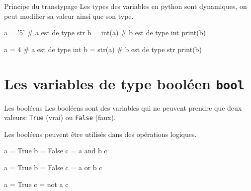 \begin{easybox}{Principe du transtypage}{}
    Les types des variables en python sont dynamiques, on peut modifier sa valeur ainsi que son type.
    
    \begin{minipage}[t]{0.48\linewidth}
        \begin{ConsolePythontex}[TaillePolice=\large, Label=false]{}
            a = '5'     # a est de type str
            b = int(a)  # b est de type int
            print(b)
        \end{ConsolePythontex}
    \end{minipage}\hfill
    \begin{minipage}[t]{0.48\linewidth}
        \begin{ConsolePythontex}[TaillePolice=\large, Label=false]{}
            a = 4       # a est de type int
            b = str(a)  # b est de type str
            print(b)
        \end{ConsolePythontex}
    \end{minipage}
    
    \end{easybox}

    \section{Les variables de type booléen \texttt{bool}}

    
\begin{easybox}{Les booléens}{}
    \smallskip
    Les booléens sont des variables qui ne peuvent prendre que deux valeurs: \verb+True+ (vrai) ou \verb+False+ (faux).
    
    \smallskip
    Les booléens peuvent être utilisés dans des opérations logiques.
    
	\medskip

    \begin{minipage}{0.32\linewidth}
        \begin{ConsolePythontex}[TaillePolice=\large, Label=false]{}
a = True
b = False
c = a and b
c
        \end{ConsolePythontex}
    \end{minipage}\hfill
    \begin{minipage}{0.32\linewidth}
        \begin{ConsolePythontex}[TaillePolice=\large, Label=false]{}
a = True
b = False
c = a or b
c
        \end{ConsolePythontex}
    \end{minipage}\hfill
    \begin{minipage}{0.32\linewidth}
        \begin{ConsolePythontex}[TaillePolice=\large, Label=false]{}
a = True
c = not a
c
        \end{ConsolePythontex}
    \end{minipage}    
\end{easybox}

